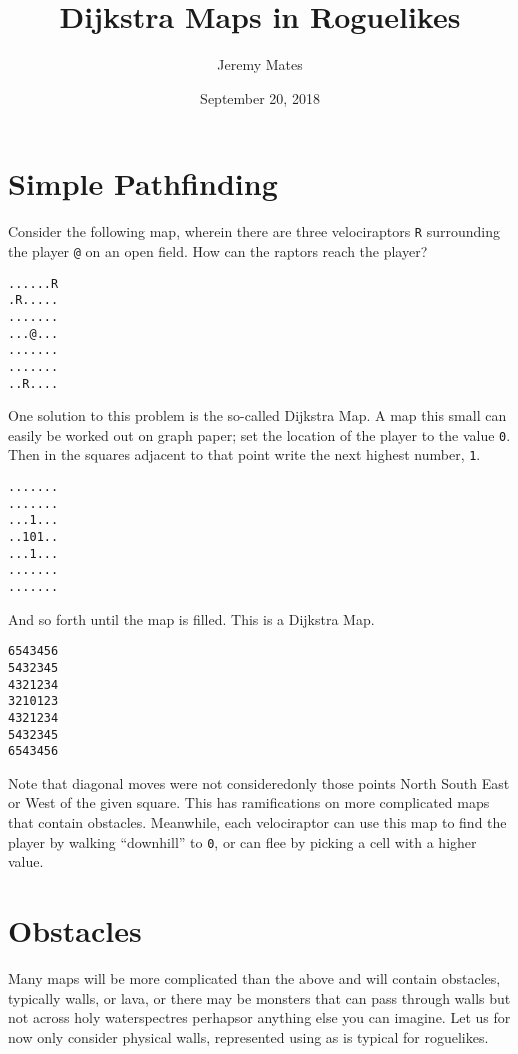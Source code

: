 \documentclass[12pt,a4paper]{article}
\title{Dijkstra Maps in Roguelikes}
\author{Jeremy Mates}
\date{September 20, 2018}
\begin{document}

\maketitle

\setlength{\parindent}{0pt}

\section*{Simple Pathfinding}

Consider the following map, wherein there are three velociraptors
\texttt{R} surrounding the player \texttt{@} on an open
field\cite{xkcd135}. How can the raptors reach the player?

\begin{verbatim}
......R
.R.....
.......
...@...
.......
.......
..R....
\end{verbatim}

One solution to this problem is the so-called Dijkstra Map\cite{tipodm}.
A map this small can easily be worked out on graph paper; set the
location of the player to the value \texttt{0}. Then in the squares
adjacent to that point write the next highest number, \texttt{1}.

\begin{verbatim}
.......
.......
...1...
..101..
...1...
.......
.......
\end{verbatim}

And so forth until the map is filled. This is a Dijkstra Map.

\begin{verbatim}
6543456
5432345
4321234
3210123
4321234
5432345
6543456
\end{verbatim}

Note that diagonal moves were not considered\textendash only those
points North South East or West of the given square. This has
ramifications on more complicated maps that contain obstacles.
Meanwhile, each velociraptor can use this map to find the player by
walking ``downhill'' to \texttt{0}, or can flee by picking a cell with a
higher value.

\section*{Obstacles}

Many maps will be more complicated than the above and will contain
obstacles, typically walls, or lava, or there may be monsters that can
pass through walls but not across holy water\textendash spectres
perhaps\textendash or anything else you can imagine. Let us for now
only consider physical walls, represented using \texttt{} as
is typical for roguelikes.
\end{document}
